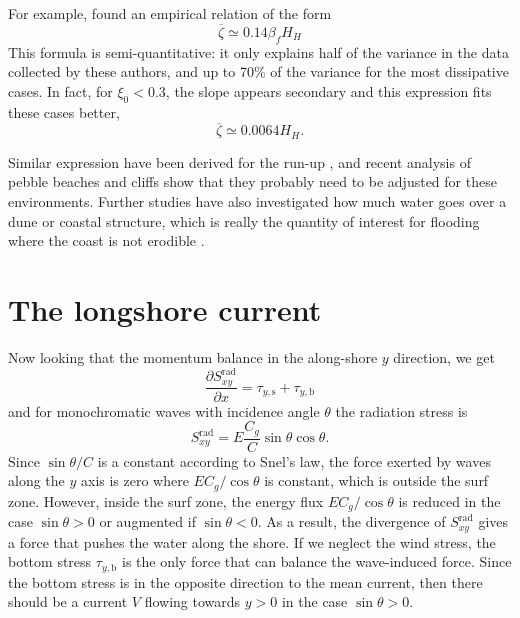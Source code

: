 For example, \cite{Stockdon&al.2006} found an empirical relation of the form 
\begin{equation}
    \overline{\zeta} \simeq  0.14 \beta_f H_H
\end{equation}
This formula is semi-quantitative: it only explains half of the variance in the data collected by these authors, and up to 70\% of the variance for the most dissipative cases. In fact, for $\xi_0 < 0.3$, the slope appears secondary and this expression fits these cases better, 
\begin{equation}
    \overline{\zeta} \simeq  0.0064  H_H.
\end{equation}

Similar expression have been derived for the run-up \citep{Holman1986}, and recent analysis of pebble beaches \citep{Poate&al.2016} and cliffs \citep{Dodet&al.2018} show that they probably need to be adjusted for these environments. 
Further studies have also investigated how much water goes over a dune or coastal structure, which is really the quantity of interest for flooding where the coast is not erodible  \citep{EuroTop2007}. 


\section{The longshore current}
Now looking that the momentum balance in the along-shore $y$ direction, we get 
\begin{equation}
    \frac{\partial S^{\mathrm{rad}}_{xy}}{\partial x}
    = \tau_{y,{\mathrm s}}  + \tau_{y,{\mathrm b}} \label{ymomentum2}
\end{equation}
and for monochromatic waves with incidence angle $ \theta$ the radiation stress is 
\begin{equation}
    S^{\mathrm{rad}}_{xy}=E \frac{C_g}{C} \sin \theta \cos \theta .
\end{equation}
Since $\sin \theta/C$ is a constant according to Snel's law, the force exerted by waves along the $y$ axis is zero where $E C_g/\cos \theta$ is constant, which is outside the surf zone. However, inside the surf zone, the energy flux $E C_g/\cos \theta$  is reduced 
in the case $\sin \theta>0$ or augmented if 
$\sin \theta<0$. As a result, the divergence of $S_{xy}^{\mathrm{rad}}$ gives a force that pushes the water along the shore. If we neglect the wind stress, the bottom stress   $\tau_{y,{\mathrm b}}$ is the only force that can balance the wave-induced force. Since the bottom stress is in the opposite direction to the mean current, then there should be a current $V$ flowing towards $y>0$ in the case $\sin \theta>0$.

